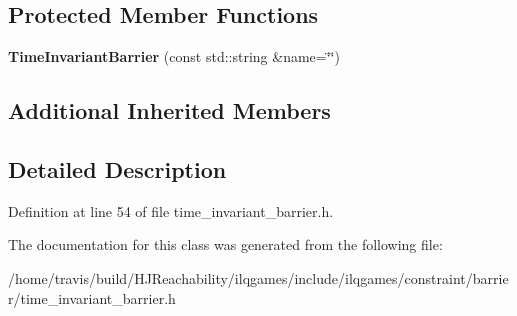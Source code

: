 \subsection*{Protected Member Functions}
\begin{DoxyCompactItemize}
\item 
{\bfseries Time\+Invariant\+Barrier} (const std\+::string \&name=\char`\"{}\char`\"{})\hypertarget{classilqgames_1_1_time_invariant_barrier_a58e8814d9272fb497acc34bd4590a5ea}{}\label{classilqgames_1_1_time_invariant_barrier_a58e8814d9272fb497acc34bd4590a5ea}

\end{DoxyCompactItemize}
\subsection*{Additional Inherited Members}


\subsection{Detailed Description}


Definition at line 54 of file time\+\_\+invariant\+\_\+barrier.\+h.



The documentation for this class was generated from the following file\+:\begin{DoxyCompactItemize}
\item 
/home/travis/build/\+H\+J\+Reachability/ilqgames/include/ilqgames/constraint/barrier/time\+\_\+invariant\+\_\+barrier.\+h\end{DoxyCompactItemize}
